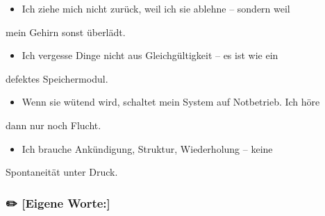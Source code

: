 {{{{\begin{itemize}
\item   Ich ziehe mich nicht zurück, weil ich sie ablehne -- sondern weil
\end{itemize}
mein Gehirn sonst überlädt.
\begin{itemize}
\item   Ich vergesse Dinge nicht aus Gleichgültigkeit -- es ist wie ein
\end{itemize}
defektes Speichermodul.
\begin{itemize}
\item   Wenn sie wütend wird, schaltet mein System auf Notbetrieb. Ich höre
\end{itemize}
dann nur noch Flucht.
\begin{itemize}
\item   Ich brauche Ankündigung, Struktur, Wiederholung -- keine
\end{itemize}
Spontaneität unter Druck.

\subsubsection{✏️ \textbf{[Eigene Worte:]}}

}}}}
